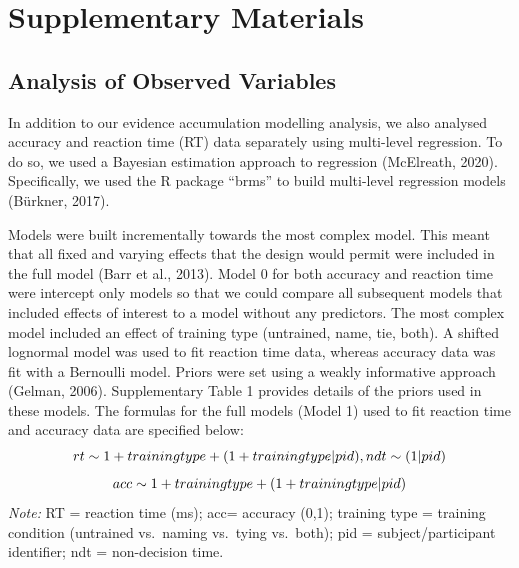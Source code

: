 \documentclass[
  man,floatsintext]{apa6}
\author{\phantom{0}}
\date{}
\affiliation{\phantom{0}}
\begin{document}
\renewcommand{\figurename}{Supplementary Figure}
\renewcommand{\tablename}{Supplemetentary Table}

\section{Supplementary Materials}\label{supplementary-materials}

\subsection{Analysis of Observed Variables}\label{analysis-of-observed-variables}

In addition to our evidence accumulation modelling analysis, we also analysed accuracy and reaction time (RT) data separately using multi-level regression. To do so, we used a Bayesian estimation approach to regression (McElreath, 2020). Specifically, we used the R package ``brms'' to build multi-level regression models (Bürkner, 2017).

Models were built incrementally towards the most complex model. This meant that all fixed and varying effects that the design would permit were included in the full model (Barr et al., 2013). Model 0 for both accuracy and reaction time were intercept only models so that we could compare all subsequent models that included effects of interest to a model without any predictors. The most complex model included an effect of training type (untrained, name, tie, both). A shifted lognormal model was used to fit reaction time data, whereas accuracy data was fit with a Bernoulli model. Priors were set using a weakly informative approach (Gelman, 2006). Supplementary Table 1 provides details of the priors used in these models. The formulas for the full models (Model 1) used to fit reaction time and accuracy data are specified below: \[rt \sim 1 + training type + \\
(1 + training type | pid), \\
ndt \sim (1 | pid)\] \[acc \sim 1 + training type + \\
(1 + training type | pid)\] \emph{Note:} RT = reaction time (ms); acc= accuracy (0,1); training type = training condition (untrained vs.~naming vs.~tying vs.~both); pid = subject/participant identifier; ndt = non-decision time.
\end{document}
